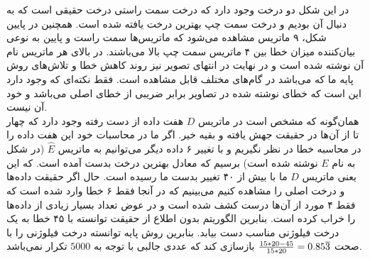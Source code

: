 در این شکل دو درخت وجود دارد که درخت سمت راستی درخت حقیقی است که به دنبال آن بودیم و درخت سمت چپ بهترین درخت یافته شده است. همچنین در پایین شکل، ۹ ماتریس مشاهده می‌شود که ماتریس‌ها سمت راست و پایین به نوعی بیان‌کننده میزان خطا بین ۴ ماتریس سمت چپ بالا می‌باشند. در بالای هر ماتریس نام آن نوشته شده است و در نهایت در انتهای تصویر نیز روند کاهش خطا و تلاش‌های روش پایه ما که  می‌باشد در گام‌های مختلف قابل مشاهده است. فقط نکته‌ای که وجود دارد این است که خطای نوشته شده در تصاویر برابر ضریبی از خطای اصلی می‌باشد و خود آن نیست.
\\
همان‌گونه که مشخص است در ماتریس $D$ هفت داده از دست رفته وجود دارد که چهار تا از آن‌ها در حقیقت جهش یافته و بقیه خیر. اگر ما در محاسبات خود این هفت داده را در محاسبه خطا در نظر نگیریم و با تغییر ۶ داده دیگر می‌توانیم به ماتریس $\hat{E}$ (در شکل به نام $E$ نوشته شده است) برسیم که معادل بهترین درخت بدست آمده است. که این یعنی ماتریس $D$ ما با بیش از ۴۰ تغییر بدست ما رسیده است. حال اگر حقیقت داده‌ها و درخت اصلی را مشاهده کنیم می‌بینیم که در آنجا فقط ۶ خطا وارد شده است که فقط ۴ مورد از آن‌ها درست کشف شده است و در عوض تعداد بسیار زیادی از داده‌ها را خراب کرده است. بنابرین الگوریتم بدون اطلاع از حقیقت توانسته با  ۴۵ خطا به یک درخت فیلوژنی مناسب دست بیابد. بنابرین روش پایه توانسته درخت فیلوژنی را با صحت 
${15*20 - 45\over15*20} = 0.85\overline{3}$
بازسازی کند که عددی جالبی با توجه به $5000$ تکرار نمی‌باشد.
